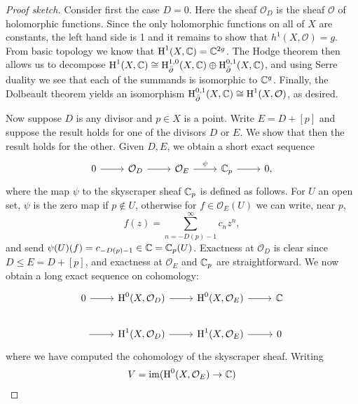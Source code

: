 \documentclass{amsart}
\begin{document}
\begin{proof}[Proof sketch]
    Consider first the case $D=0$. Here the sheaf $\mathcal{O}_D$ is the sheaf $\mathcal{O}$ of holomorphic functions.
    Since the only holomorphic functions on all of $X$ are constants, the left hand side is 1 and it
    remains to show that $h^1(X,\mathcal{O}) = g$.  From basic topology we know that $\operatorname{H}^1(X, \mathbb{C})=\mathbb{C}^{2g}$.
    The Hodge theorem then allows us to decompose $\operatorname{H}^1(X, \mathbb{C})\cong \operatorname{H}_{\bar\partial}^{1,0}(X,\mathbb{C})\oplus\operatorname{H}_{\bar\partial}^{0,1}(X,\mathbb{C})$,
    and using Serre duality we see that each of the summands is isomorphic to $\mathbb{C}^g$. Finally, the Dolbeault
    theorem yields an isomorphism $\operatorname{H}_{\bar\partial}^{0,1}(X,\mathbb{C})\cong \operatorname{H}^1(X,\mathcal{O})$, as desired.

    Now suppose $D$ is any divisor and $p\in X$ is a point. Write $E= D + [p]$ and suppose the result holds
    for one of the divisors $D$ or $E$. We show that then the result holds for the other.
    Given $D, E$, we obtain a short exact sequence
    \begin{equation*}
        \begin{tikzcd}
            0\rar & \mathcal{O}_D\rar & \mathcal{O}_E\rar{\psi} & \C_p\rar & 0,
        \end{tikzcd}
    \end{equation*}
    where the map $\psi$ to the skyscraper sheaf $\mathbb{C}_p$ is defined as follows. For $U$ an open set, $\psi$ is
    the zero map if $p\notin U$, otherwise for $f\in\mathcal{O}_E(U)$ we can write, near $p$,
    \begin{equation*}
        f(z) = \sum_{n=-D(p)-1}^\infty c_n z^n,
    \end{equation*}
    and send $\psi(U)(f)=c_{-D(p)-1}\in\mathbb{C}=\mathbb{C}_p(U)$.
    Exactness at $\mathcal{O}_D$ is clear since $D\leqslant E=D+[p]$, and exactness at $\mathcal{O}_E$ and
    $\mathbb{C}_p$ are straightforward.
    We now obtain a long exact sequence on cohomology:
    \begin{equation*}
        \begin{tikzcd}
            0\rar & \HH^0(X, \mathcal{O}_D)\rar & \HH^0(X, \mathcal{O}_E)\rar & \C \\
            \;\rar & \HH^1(X,\mathcal{O}_D)\rar & \HH^1(X,\mathcal{O}_E)\rar & 0
        \end{tikzcd}
    \end{equation*}
    where we have computed the cohomology of the skyscraper sheaf. Writing
    \begin{align*}
        V &= \im(\HH^0(X,\mathcal{O}_E)\to \C)\\

\end{align*}
\end{proof}
\end{document}
